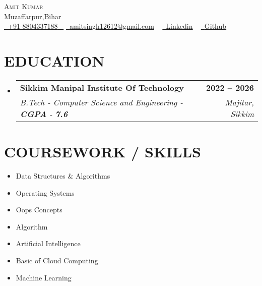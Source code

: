 \documentclass[letterpaper,11pt]{article}
\makeatletter
\newcommand{\resumeSubheading}[4]{
  \vspace{-2pt}\item
    \begin{tabular*}{1.0\textwidth}[t]{l@{\extracolsep{\fill}}r}
      \textbf{\large#1} & \textbf{\small #2} \\
      \textit{\large#3} & \textit{\small #4} \\
      
    \end{tabular*}\vspace{-7pt}
}
\newcommand{\resumeSubHeadingListStart}{\begin{itemize}[leftmargin=0.0in, label={}]}
\newcommand{\resumeSubHeadingListEnd}{\end{itemize}}
\makeatother
\begin{document}


\begin{center}
    {\Huge \scshape Amit Kumar} \\ \vspace{1pt}
    Muzaffarpur,Bihar \\ \vspace{1pt}
    \small \href{tel:#}{ \raisebox{-0.1\height}\faPhone\ \underline{+91-8804337188} ~} \href{mailto:amitsingh12612@gmail.com}{\raisebox{-0.2\height}\faEnvelope\  \underline{amitsingh12612@gmail.com}} ~ 
    \href{https://www.linkedin.com/in/amit-kumar-9418ab205/}{\raisebox{-0.2\height}\faLinkedinSquare\ \underline{Linkedin}}  ~
    \href{https://github.com/amit6305}{\raisebox{-0.2\height}\faGithub\ \underline{Github}} ~
\end{center}
 \vspace{0.5mm}


\section{EDUCATION}
  \resumeSubHeadingListStart
    \resumeSubheading
      { Sikkim Manipal Institute Of Technology }{2022 – 2026}
      {B.Tech - Computer Science and Engineering - \textbf{CGPA} - \textbf{7.6}}{Majitar, Sikkim}
  \resumeSubHeadingListEnd
  

\section{COURSEWORK / SKILLS}
        \begin{multicols}{4}
            \begin{itemize}[itemsep=-2pt, parsep=5pt]
                \item Data Structures \& Algorithms
                \item Operating Systems
                \item Oops Concepts
                \item Algorithm
                \item Artificial Intelligence
                \item Basic of Cloud Computing
                \item Machine Learning
            \end{itemize}
        \end{multicols}
        \vspace*{2.0\multicolsep}
\end{document}
